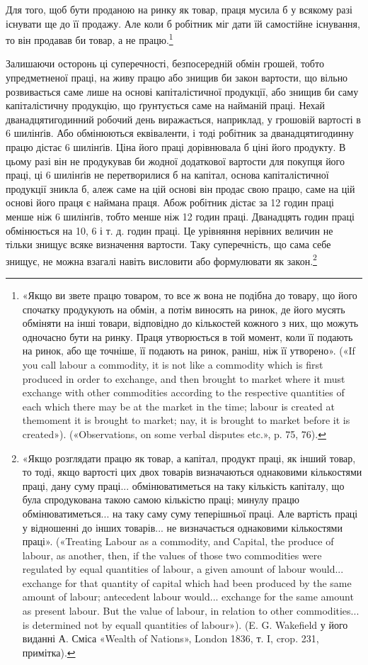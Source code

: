 Для того, щоб бути проданою на ринку як товар, праця мусила
б у всякому разі існувати ще до її продажу. Але коли б
робітник міг дати їй самостійне існування, то він продавав би
товар, а не працю.\footnote{
«Якщо ви звете працю товаром, то все ж вона не подібна до товару,
що його спочатку продукують на обмін, а потім виносять на ринок, де
його мусять обміняти на інші товари, відповідно до кількостей кожного
з них, що можуть одночасно бути на ринку. Праця утворюється в той
момент, коли її подають на ринок, або ще точніше, її подають на ринок,
раніш, ніж її утворено». («If you call labour a commodity, it is not like a
commodity which is first produced in order to exchange, and then brought
to market where it must exchange with other commodities according to the
respective quantities of each which there may be at the market in the
time; labour is created at themoment it is brought to market; nay, it is
brought to market before it is created»). («Observations, on some verbal
disputes etc.», p. 75, 76).
}

Залишаючи осторонь ці суперечності, безпосередній обмін грошей,
тобто упредметненої праці, на живу працю або знищив би
закон вартости, що вільно розвивається саме лише на основі
капіталістичної продукції, або знищив би саму капіталістичну
продукцію, що ґрунтується саме на найманій праці. Нехай дванадцятигодинний
робочий день виражається, наприклад, у грошовій
вартості в 6 шилінґів. Або обмінюються еквіваленти, і тоді
робітник за дванадцятигодинну працю дістає 6 шилінґів. Ціна
його праці дорівнювала б ціні його продукту. В цьому разі він
не продукував би жодної додаткової вартости для покупця його
праці, ці 6 шилінґів не перетворилися б на капітал, основа капіталістичної
продукції зникла б, алеж саме на цій основі він
продає свою працю, саме на цій основі його праця є наймана
праця. Абож робітник дістає за 12 годин праці менше ніж 6 шилінґів,
тобто менше ніж 12 годин праці. Дванадцять годин праці
обмінюється на 10, 6 і т. д. годин праці. Це урівняння нерівних
величин не тільки знищує всяке визначення вартости. Таку
суперечність, що сама себе знищує, не можна взагалі навіть висловити
або формулювати як закон.\footnote{
«Якщо розглядати працю як товар, а капітал, продукт праці,
як інший товар, то тоді, якщо вартості цих двох товарів визначаються
однаковими кількостями праці, дану суму праці... обмінюватиметься
на таку кількість капіталу, що була спродукована такою самою кількістю
праці; минулу працю обмінюватиметься... на таку саму суму теперішньої
праці. Але вартість праці у відношенні до інших товарів... не визначається
однаковими кількостями праці». («Treating Labour as a commodity,
and Capital, the produce of labour, as another, then, if the values
of those two commodities were regulated by equal quantities of labour,
a given amount of labour would... exchange for that quantity of capital
which had been produced by the same amount of labour; antecedent labour
would... exchange for the same amount as present labour. But the value
of labour, in relation to other commodities... is determined not by equall
quantities of labour»). (E. G. Wakefield у його виданні А. Сміса «Wealth
of Nations», London 1836, т. I, crop. 231, примітка).
}

